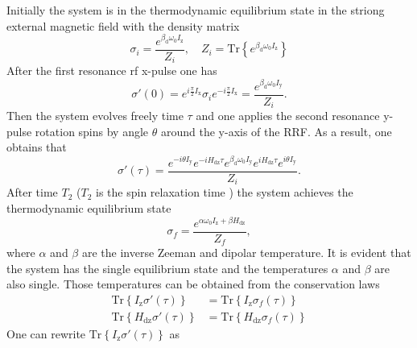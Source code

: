 \documentclass[review]{elsarticle}
\begin{document}
Initially the system is in the thermodynamic equilibrium state in the striong external magnetic field with the density matrix
%
\begin{equation}
    \label{eq:a1}
   \sigma_{i} = \dfrac{e^{\beta_\mathrm{d} \omega_{0} I_\mathrm{z}}}{Z_{i}} ,
   \quad
   Z_{i} = \mathrm{Tr}\left\{e^{\beta_\mathrm{d} \omega_{0} I_\mathrm{z}} \right\}
\end{equation}
%
After the first resonance rf x-pulse one has
%
\begin{equation}
    \label{eq:a2}
    \sigma'(0) = e^{ i \frac \pi 2 I_\mathrm{x}}
    \sigma_{i}
    e^{-i \frac \pi 2 I_\mathrm{x}}
    = \dfrac{e^{\beta_\mathrm{d} \omega_{0} I_\mathrm{y}}}{Z_{i}}  .
\end{equation}
%
Then the system evolves freely time $\tau$ 
and one applies the second resonance y-pulse rotation spins by angle $\theta$ around the y-axis of the RRF.
As a result, one obtains that
\begin{equation}
    \label{eq:a3}
    \sigma'(\tau) 
    = \dfrac{
      e^{-i \theta I_\mathrm{y}} e^{-i H_\mathrm{dz} \tau} 
      e^{\beta_\mathrm{d} \omega_{0} I_\mathrm{y}}
      e^{i H_\mathrm{dz} \tau} e^{i \theta I_\mathrm{y}}
    }{Z_{i}}. 
\end{equation}
%
After time $T_2$ ($T_2$ is the spin relaxation time \cite{Andrew_1971}) the system achieves the thermodynamic equilibrium state
\begin{equation}
    \label{eq:a4}
    \sigma_{f} 
    = \dfrac{ e^{\alpha \omega_{0} I_\mathrm{z} + \beta H_\mathrm{dz}} }{Z_f},
\end{equation}
%
where $\alpha$ and $\beta$ are the inverse Zeeman and dipolar temperature.
It is evident that the system has the single equilibrium state 
and the temperatures $\alpha$ and $\beta$ are also single.
Those temperatures can be obtained from the conservation laws
\begin{align}
    \label{eq:a5}
    \mathrm{Tr} \left\{ I_\mathrm{z} \sigma'(\tau) \right\}
    & = \mathrm{Tr} \left\{ I_\mathrm{z} \sigma_{f}(\tau) \right\}
    \\
    \label{eq:a6}
    \mathrm{Tr} \left\{ H_\mathrm{dz} \sigma'(\tau) \right\}
    & = \mathrm{Tr} \left\{ H_\mathrm{dz} \sigma_{f}(\tau) \right\}
\end{align}
%
One can rewrite $\mathrm{Tr} \left\{ I_\mathrm{z} \sigma'(\tau) \right\}$ as 
%
\end{document}
